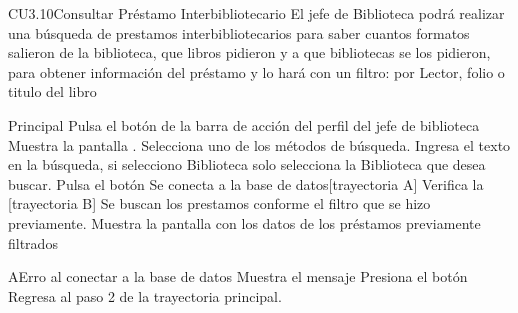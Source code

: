 
	\begin{UseCase}{CU3.10}{Consultar Préstamo Interbibliotecario}{
		El jefe de Biblioteca podrá realizar una búsqueda de prestamos interbibliotecarios para saber cuantos formatos salieron de la biblioteca, que libros pidieron y a que bibliotecas se los pidieron, para obtener información del préstamo y lo hará con un filtro: por Lector, folio o titulo del libro
	}
	\end{UseCase}
	\begin{UCtrayectoria}{Principal}
		\UCpaso[\UCactor]Pulsa el botón  de la barra de acción del perfil del jefe de biblioteca
		\UCpaso[\UCsist]Muestra la pantalla .
		\UCpaso[\UCactor]Selecciona uno de los métodos de búsqueda.
		\UCpaso[\UCactor]Ingresa el texto en la búsqueda, si selecciono Biblioteca solo selecciona la Biblioteca que desea buscar.
		\UCpaso[\UCactor]Pulsa el botón 
		\UCpaso[\UCsist]Se conecta a la base de datos[trayectoria A]
		\UCpaso[\UCsist]Verifica la  [trayectoria B]
		\UCpaso[\UCsist]Se buscan los prestamos conforme el filtro que se hizo previamente.
		\UCpaso[\UCsist]Muestra la pantalla  con los datos de los préstamos previamente filtrados
	\end{UCtrayectoria}
		\begin{UCtrayectoriaA}{A}{Erro al conectar a la base de datos}
			\UCpaso[\UCsist] Muestra el mensaje 
			\UCpaso[\UCactor] Presiona el botón 
			\UCpaso[\UCsist] Regresa al paso 2 de la trayectoria principal.
		\end{UCtrayectoriaA}	
		
